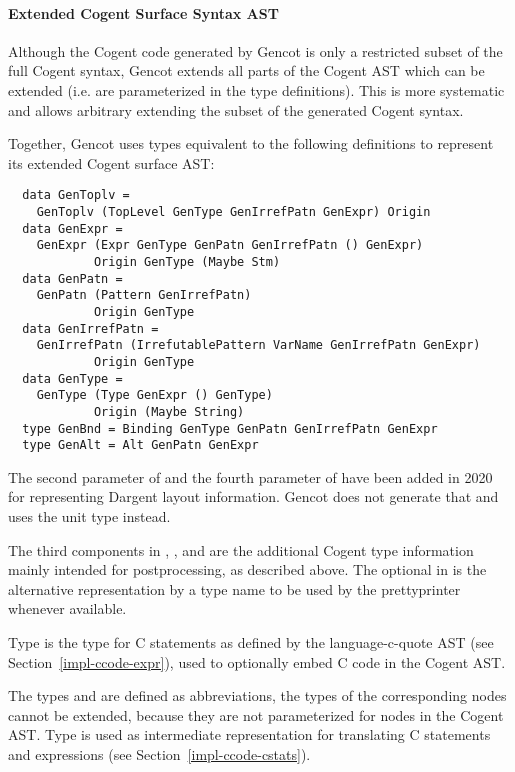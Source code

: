 \paragraph{Extended Cogent Surface Syntax AST}

Although the Cogent code generated by Gencot is only a restricted subset of the full Cogent syntax, Gencot extends all parts 
of the Cogent AST which can be extended (i.e. are parameterized in the type definitions). This is more systematic and 
allows arbitrary extending the subset of the generated Cogent syntax.

Together, Gencot uses types equivalent to the following definitions to represent its extended Cogent surface AST:
\begin{verbatim}
  data GenToplv =
    GenToplv (TopLevel GenType GenIrrefPatn GenExpr) Origin
  data GenExpr =
    GenExpr (Expr GenType GenPatn GenIrrefPatn () GenExpr)
            Origin GenType (Maybe Stm)
  data GenPatn =
    GenPatn (Pattern GenIrrefPatn)
            Origin GenType
  data GenIrrefPatn = 
    GenIrrefPatn (IrrefutablePattern VarName GenIrrefPatn GenExpr)
            Origin GenType
  data GenType = 
    GenType (Type GenExpr () GenType)
            Origin (Maybe String)
  type GenBnd = Binding GenType GenPatn GenIrrefPatn GenExpr
  type GenAlt = Alt GenPatn GenExpr
\end{verbatim}
The second parameter of  and the fourth parameter of  have been added in 2020 for representing 
Dargent layout information. Gencot does not generate that and uses the unit type instead.

The third components in , , and  are the additional Cogent type information
mainly intended for postprocessing, as described above. The optional  in  is the alternative
representation by a type name to be used by the prettyprinter whenever available.

Type  is the type for C statements as defined by the language-c-quote AST 
(see Section~\ref{impl-ccode-expr}), used to optionally embed C code in the Cogent AST.

The types  and  are defined as abbreviations, the types of the corresponding nodes cannot be extended,
because they are not parameterized for  nodes in the Cogent AST. Type  is used as intermediate
representation for translating C statements and expressions (see Section~\ref{impl-ccode-cstats}).

